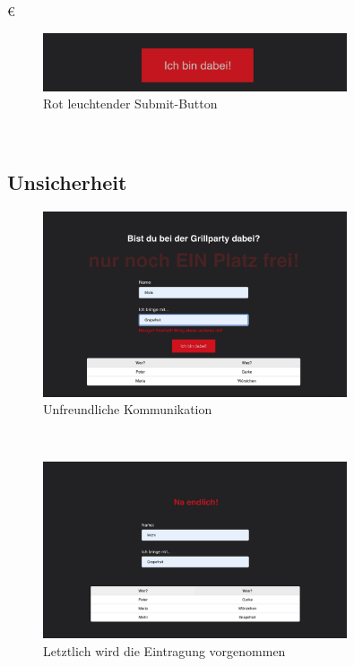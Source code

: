 €\documentclass[./dokumentation.tex]{subfiles}
\begin{document}
\begin{figure}[H]
    \centering
    \includegraphics[width=0.8\textwidth]{bilder/rot-dabei.png}
    \caption{Rot leuchtender Submit-Button}
    \label{fig15:submit}
\end{figure}\\


\subsection{Unsicherheit}

\begin{figure}[H]
    \centering
    \includegraphics[width=0.8\textwidth]{bilder/ekelhaft.png}
    \caption{Unfreundliche Kommunikation} %
    \label{fig16:ekel}
\end{figure}\\


\begin{figure}[H]
    \centering
    \includegraphics[width=0.8\textwidth]{bilder/na-endlich.png}
    \caption{Letztlich wird die Eintragung vorgenommen}
    \label{fig17:okay}
\end{figure}\\
\end{document}
